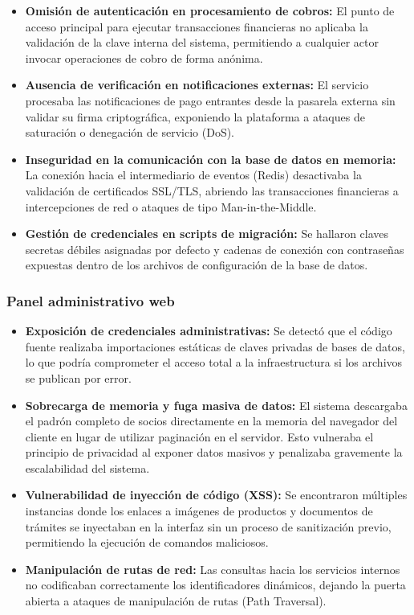 \begin{itemize}
    \item \textbf{Omisión de autenticación en procesamiento de cobros:} El punto de acceso principal para ejecutar transacciones financieras no aplicaba la validación de la clave interna del sistema, permitiendo a cualquier actor invocar operaciones de cobro de forma anónima.
    \item \textbf{Ausencia de verificación en notificaciones externas:} El servicio procesaba las notificaciones de pago entrantes desde la pasarela externa sin validar su firma criptográfica, exponiendo la plataforma a ataques de saturación o denegación de servicio (DoS).
    \item \textbf{Inseguridad en la comunicación con la base de datos en memoria:} La conexión hacia el intermediario de eventos (Redis) desactivaba la validación de certificados SSL/TLS, abriendo las transacciones financieras a intercepciones de red o ataques de tipo Man-in-the-Middle.
    \item \textbf{Gestión de credenciales en scripts de migración:} Se hallaron claves secretas débiles asignadas por defecto y cadenas de conexión con contraseñas expuestas dentro de los archivos de configuración de la base de datos.
\end{itemize}

\subsubsection{Panel administrativo web}

\begin{itemize}
    \item \textbf{Exposición de credenciales administrativas:} Se detectó que el código fuente realizaba importaciones estáticas de claves privadas de bases de datos, lo que podría comprometer el acceso total a la infraestructura si los archivos se publican por error.
    \item \textbf{Sobrecarga de memoria y fuga masiva de datos:} El sistema descargaba el padrón completo de socios directamente en la memoria del navegador del cliente en lugar de utilizar paginación en el servidor. Esto vulneraba el principio de privacidad al exponer datos masivos y penalizaba gravemente la escalabilidad del sistema.
    \item \textbf{Vulnerabilidad de inyección de código (XSS):} Se encontraron múltiples instancias donde los enlaces a imágenes de productos y documentos de trámites se inyectaban en la interfaz sin un proceso de sanitización previo, permitiendo la ejecución de comandos maliciosos.
    \item \textbf{Manipulación de rutas de red:} Las consultas hacia los servicios internos no codificaban correctamente los identificadores dinámicos, dejando la puerta abierta a ataques de manipulación de rutas (Path Traversal).
\end{itemize}

